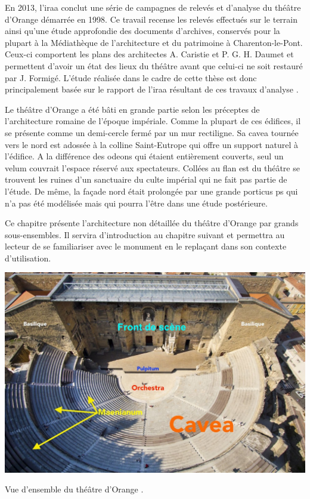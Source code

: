 		
		En 2013, l'\gls{iraa} conclut une série de campagnes de relevés et d'analyse du théâtre d'Orange démarrée en 1998. Ce travail recense les relevés effectués sur le terrain ainsi qu'une étude approfondie des documents d'archives, conservés pour la plupart à la Médiathèque de l'architecture et du patrimoine à Charenton-le-Pont. Ceux-ci comportent les plans des architectes A. Caristie et P. G. H. Daumet et permettent d'avoir un état des lieux du théâtre avant que celui-ci ne soit restauré par J. Formigé. L'étude réalisée dans le cadre de cette thèse est donc principalement basée sur le rapport de l'\gls{iraa} résultant de ces travaux d'analyse \cite{orangeTxt}\cite{orangePl}.
		
		Le théâtre d'Orange a été bâti en grande partie selon les préceptes de l'architecture romaine de l'époque impériale. Comme la plupart de ces édifices, il se présente comme un demi-cercle fermé par un mur rectiligne. Sa \gls{cavea} tournée vers le nord est adossée à la colline Saint-Eutrope qui offre un support naturel à l'édifice. A la différence des \glspl{odeon} qui étaient entièrement couverts, seul un \gls{velum} couvrait l'espace réservé aux spectateurs. Collées au flan est du théâtre se trouvent les ruines d'un sanctuaire du culte impérial qui ne fait pas partie de l'étude. De même, la façade nord était prolongée par une grande \gls{porticus ps} qui n'a pas été modélisée mais qui pourra l'être dans une étude postérieure. 
		
		Ce chapitre présente l'architecture non détaillée du théâtre d'Orange par grands sous-ensembles. Il servira d'introduction au chapitre suivant et permettra au lecteur de se familiariser avec le monument en le replaçant dans son contexte d'utilisation.

	\begin{figureth}
			\includegraphics[width=\linewidth]{images/vuensemble}
			\caption[Vue d'ensemble du théâtre d'Orange]{Vue d'ensemble du théâtre d'Orange \footnotemark.}
	\end{figureth}

